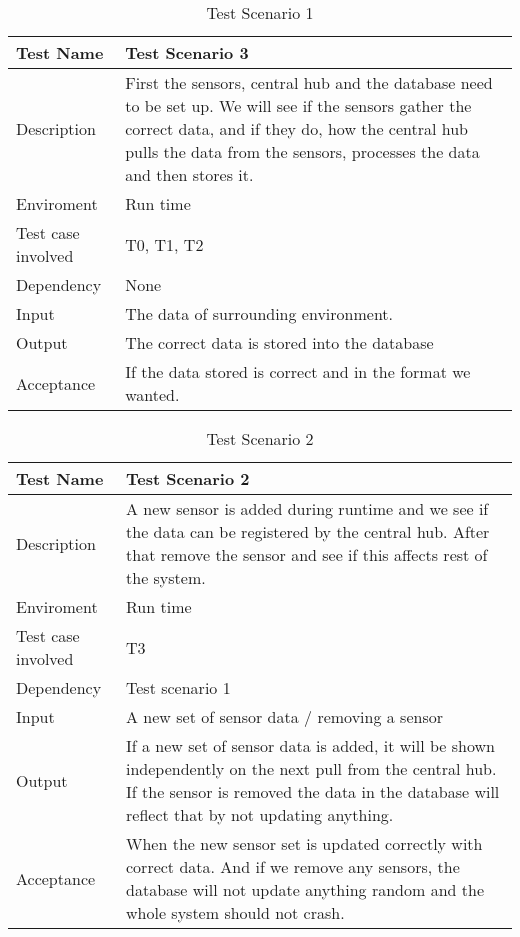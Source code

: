 \documentclass[../document]{subfiles}
\begin{document}
\begin{table}[H]
\caption{Test Scenario 1}
\centering
\begin{tabularx}{\textwidth}{|l|X|}
	\hline
	Test Name
	&Test Scenario 3
	\\ \hline Description
	&First the sensors, central hub and the database need to be set up. We will see if the sensors gather the correct data, and if they do, how the central hub pulls the data from the sensors, processes the data and then stores it.
	\\ \hline Enviroment
	&Run time
	\\ \hline Test case involved
	&T0, T1, T2
	\\ \hline Dependency
	&None
	\\ \hline Input
	&The data of surrounding environment.
	\\ \hline Output
	&The correct data is stored into the database
	\\ \hline Acceptance
	&If the data stored is correct and in the format we wanted.		
	\\ \hline 
\end{tabularx}
\end{table}

\begin{table}[H]
\caption{Test Scenario 2}
\centering
\begin{tabularx}{\textwidth}{|l|X|}
	\hline
	Test Name
	&Test Scenario 2
	\\ \hline Description
	&A new sensor is added during runtime and we see if the data can be registered by the central hub. After that remove the sensor and see if this affects rest of the system. 
	\\ \hline Enviroment
	&Run time
	\\ \hline Test case involved
	&T3
	\\ \hline Dependency
	&Test scenario 1
	\\ \hline Input
	&A new set of sensor data / removing a sensor
	\\ \hline Output
	&If a new set of sensor data is added, it will be shown independently on the next pull from the central hub. If the sensor is removed the data in the database will reflect that by not updating anything.
	\\ \hline Acceptance
	&When the new sensor set is updated correctly with correct data. And if we remove any sensors, the database will not update anything random and the whole system should not crash.
	\\ \hline 
\end{tabularx}
\end{table}
\end{document}
